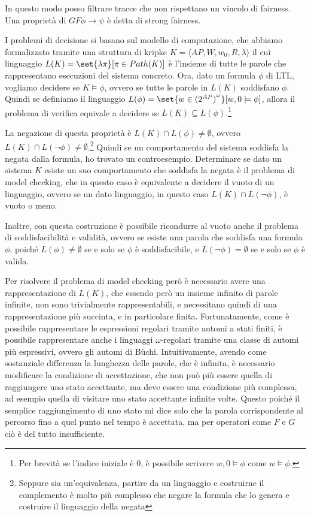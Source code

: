 In questo modo posso filtrare tracce che non rispettano un vincolo di fairness. Una proprietà di \(G F \phi \to \psi\) è detta di strong fairness.

I problemi di decisione si basano sul modello di computazione, che abbiamo formalizzato tramite una struttura di kripke \(K = \langle AP, W, w_0, R, \lambda\rangle\) il cui linguaggio \(L(K) = \set{\lambda{\pi}}[\pi \in Path(K)]\) è l'insieme di tutte le parole che rappresentano esecuzioni del sistema concreto. Ora, dato un formula \(\phi\) di LTL\@, vogliamo decidere se \(K \models \phi\), ovvero se tutte le parole in \(L(K)\) soddisfano \(\phi\). Quindi se definiamo il linguaggio \(L(\phi) = \set{w \in {(2^{AP})}^\omega }[ w,0 \models \phi]\), allora il problema di verifica equivale a decidere se \(L(K) \subseteq L(\phi)\).\footnote{Per brevità se l'indice iniziale è \(0\), è possibile scrivere \(w,0\models \phi\) come \(w\models \phi\).}

La negazione di questa proprietà è \(L(K) \cap \overline{L(\phi)} \neq \emptyset\), ovvero \(L(K) \cap L(\neg \phi) \neq \emptyset\).\footnote{Seppure sia un'equivalenza, partire da un linguaggio e costruirne il complemento è molto più complesso che negare la formula che lo genera e costruire il linguaggio della negata} Quindi se un comportamento del sistema soddisfa la negata dalla formula, ho trovato un controesempio. Determinare se dato un sistema \(K\) esiste un suo comportamento che soddisfa la negata è il problema di model checking, che in questo caso è equivalente a decidere il vuoto di un linguaggio, ovvero se un dato linguaggio, in questo caso \(L(K) \cap L(\neg \phi)\), è vuoto o meno. 

Inoltre, con questa costruzione è possibile ricondurre al vuoto anche il problema di soddisfacibilità e validità, ovvero se esiste una parola che soddisfa una formula \(\phi\), poiché \(L(\phi) \neq \emptyset\) se e solo se \(\phi\) è soddisfacibile, e \(L(\neg \phi) = \emptyset\) se e solo se \(\phi\) è valida.

Per risolvere il problema di model checking però è necessario avere una rappresentazione di \(L(K)\), che essendo però un insieme infinito di parole infinite, non sono trivialmente rappresentabili, e necessitano quindi di una rappresentazione più succinta, e in particolare finita.
Fortunatamente, come è possibile rappresentare le espressioni regolari tramite automi a stati finiti, è possibile rappresentare anche i linguaggi \(\omega\)-regolari tramite una classe di automi più espressivi, ovvero gli automi di Büchi. Intuitivamente, avendo come sostanziale differenza la lunghezza delle parole, che è infinita, è necessario modificare la condizione di accettazione, che non può più essere quella di raggiungere uno stato accettante, ma deve essere una condizione più complessa, ad esempio quella di visitare uno stato accettante infinite volte. Questo poiché il semplice raggiungimento di uno stato mi dice solo che la parola corrispondente al percorso fino a quel punto nel tempo è accettata, ma per operatori come \(F\) e \(G\) ciò è del tutto insufficiente.

